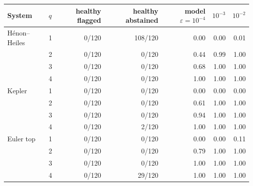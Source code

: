 \begin{tabular}{llrrrrr}
\toprule
System & $q$ & healthy flagged & healthy abstained & model $\varepsilon{=}10^{-4}$ & $10^{-3}$ & $10^{-2}$ \\
\midrule
H\'enon--Heiles & 1 & 0/120 & 108/120 & 0.00 & 0.00 & 0.01 \\
 & 2 & 0/120 & 0/120 & 0.44 & 0.99 & 1.00 \\
 & 3 & 0/120 & 0/120 & 0.68 & 1.00 & 1.00 \\
 & 4 & 0/120 & 0/120 & 1.00 & 1.00 & 1.00 \\
\addlinespace
Kepler & 1 & 0/120 & 0/120 & 0.00 & 0.00 & 0.00 \\
 & 2 & 0/120 & 0/120 & 0.61 & 1.00 & 1.00 \\
 & 3 & 0/120 & 0/120 & 0.94 & 1.00 & 1.00 \\
 & 4 & 0/120 & 2/120 & 1.00 & 1.00 & 1.00 \\
\addlinespace
Euler top & 1 & 0/120 & 0/120 & 0.00 & 0.00 & 0.11 \\
 & 2 & 0/120 & 0/120 & 0.79 & 1.00 & 1.00 \\
 & 3 & 0/120 & 0/120 & 1.00 & 1.00 & 1.00 \\
 & 4 & 0/120 & 29/120 & 1.00 & 1.00 & 1.00 \\
\bottomrule
\end{tabular}
